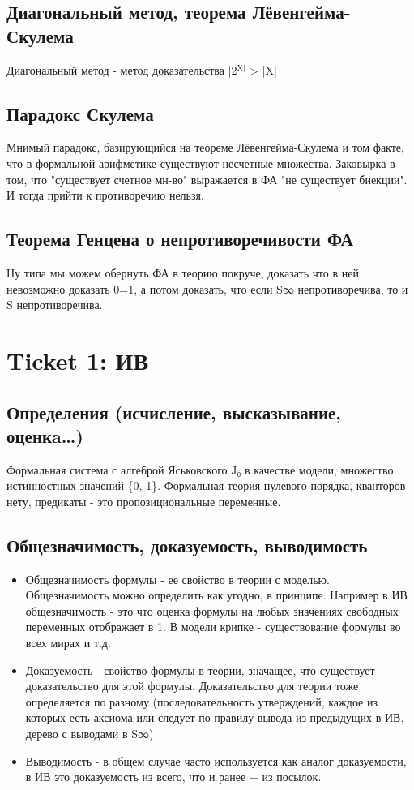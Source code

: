 \documentclass[11pt]{article}
\begin{document}
\subsection{Диагональный метод, теорема Лёвенгейма-Скулема}
\label{sec-2-43}
Диагональный метод - метод доказательства |2$^{\text{X|}}$ > |X|
\subsection{Парадокс Скулема}
\label{sec-2-44}
Мнимый парадокс, базирующийся на теореме Лёвенгейма-Скулема
и том факте, что в формальной арифметике существуют несчетные
множества. Заковырка в том, что "существует счетное мн-во" выражается
в ФА "не существует биекции". И тогда прийти к противоречию
нельзя.
\subsection{Теорема Генцена о непротиворечивости ФА}
\label{sec-2-45}
Ну типа мы можем обернуть ФА в теорию покруче, доказать что в ней
невозможно доказать 0=1, а потом доказать, что если S∞ непротиворечива,
то и S непротиворечива.
\section{Ticket 1: ИВ}
\label{sec-3}
\subsection{Определения (исчисление, высказывание, оценкa\ldots{})}
\label{sec-3-1}
Формальная система с алгеброй Яськовского J₀ в качестве модели, множество
истинностных значений \{0, 1\}. Формальная теория нулевого порядка, кванторов
нету, предикаты - это пропозициональные переменные.
\subsection{Общезначимость, доказуемость, выводимость}
\label{sec-3-2}
\begin{itemize}
\item Общезначимость формулы - ее свойство в теории с моделью. Общезначимость
можно определить как угодно, в принципе. Например в ИВ общезначимость -
это что оценка формулы на любых значениях свободных переменных отображает
в 1. В модели крипке - существование формулы во всех мирах и т.д.
\item Доказуемость - свойство формулы в теории, значащее, что существует
доказательство для этой формулы. Доказательство для теории тоже определяется
по разному (последовательность утверждений, каждое из которых есть аксиома
или следует по правилу вывода из предыдущих в ИВ, дерево с выводами в S∞)
\item Выводимость - в общем случае часто используется как аналог доказуемости,
в ИВ это доказуемость из всего, что и ранее + из посылок.
\end{itemize}
\end{document}
